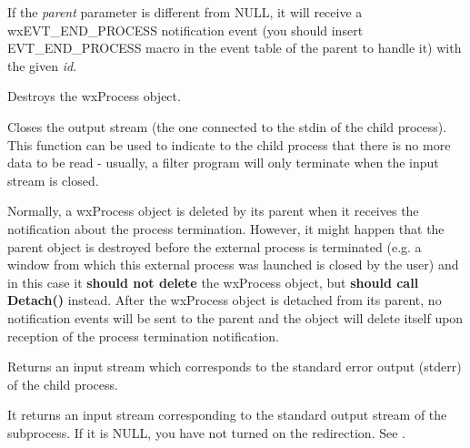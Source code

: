 If the {\it parent} parameter is different from NULL, it will receive
a wxEVT\_END\_PROCESS notification event (you should insert EVT\_END\_PROCESS
macro in the event table of the parent to handle it) with the given {\it id}.






Destroys the wxProcess object.

\label{wxprocesscloseoutput}


Closes the output stream (the one connected to the stdin of the child
process). This function can be used to indicate to the child process that
there is no more data to be read - usually, a filter program will only
terminate when the input stream is closed.

\label{wxprocessdetach}


Normally, a wxProcess object is deleted by its parent when it receives the
notification about the process termination. However, it might happen that the
parent object is destroyed before the external process is terminated (e.g. a
window from which this external process was launched is closed by the user)
and in this case it {\bf should not delete} the wxProcess object, but 
{\bf should call Detach()} instead. After the wxProcess object is detached
from its parent, no notification events will be sent to the parent and the
object will delete itself upon reception of the process termination
notification.

\label{wxprocessgeterrorstream}


Returns an input stream which corresponds to the standard error output (stderr)
of the child process.

\label{wxprocessgetinputstream}


It returns an input stream corresponding to the standard output stream of the
subprocess. If it is NULL, you have not turned on the redirection.
See .

